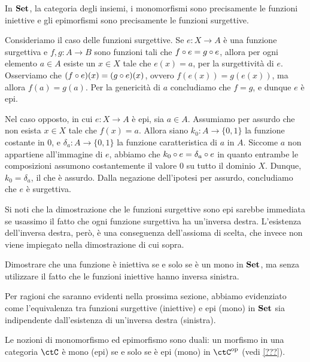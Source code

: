 \begin{example}
	In \(\mathbf{Set}\), la categoria degli insiemi, i monomorfismi sono precisamente le funzioni iniettive
	e gli epimorfismi sono precisamente le funzioni surgettive.

	Consideriamo il caso delle funzioni surgettive.
	Se \(e \colon X \to A\) è una funzione surgettiva e \(f, g \colon A \to B\) sono funzioni tali che \(f \circ e = g \circ e\),
	allora per ogni elemento \(a \in A\) esiste un \(x \in X\) tale che \(e(x) = a\), per la surgettività di \(e\).
	Osserviamo che \((f \circ e)(x) = (g \circ e)(x)\), ovvero \(f(e(x)) = g(e(x))\),
	ma allora \(f(a) = g(a)\).
	Per la genericità di \(a\) concludiamo che \(f = g\), e dunque \(e\) è epi.

	Nel caso opposto, in cui \(e \colon X \to A\) è epi, sia \(a \in A\).
	Assumiamo per assurdo che non esista \(x \in X\) tale che \(f(x) = a\).
	Allora siano \(k_0 \colon A \to \{0, 1\}\) la funzione costante in \(0\),
	e \(\delta_a \colon A \to \{0, 1\}\) la funzione caratteristica di \(a\) in \(A\).
	Siccome \(a\) non appartiene all'immagine di \(e\), abbiamo che \(k_0 \circ e = \delta_a \circ e\)
	in quanto entrambe le composizioni assumono costantemente il valore \(0\) su tutto il dominio \(X\).
	Dunque, \(k_0 = \delta_a\), il che è assurdo.
	Dalla negazione dell'ipotesi per assurdo, concludiamo che \(e\) è surgettiva.
\end{example}

Si noti che la dimostrazione che le funzioni surgettive sono epi sarebbe immediata
se usassimo il fatto che ogni funzione surgettiva ha un'inversa destra.
L'esistenza dell'inversa destra, però, è una conseguenza dell'assioma di scelta,
che invece non viene impiegato nella dimostrazione di cui sopra.

\begin{exercise}
	Dimostrare che una funzione è iniettiva se e solo se è un mono in \(\mathbf{Set}\),
	ma senza utilizzare il fatto che le funzioni iniettive hanno inversa sinistra.
\end{exercise}

Per ragioni che saranno evidenti nella prossima sezione,
abbiamo evidenziato come l'equivalenza tra funzioni surgettive (iniettive)
e epi (mono) in \(\mathbf{Set}\) sia indipendente dall'esistenza di un'inversa destra (sinistra).

\begin{remark}
\label{rmk:mono-epi-duality}
Le nozioni di monomorfismo ed epimorfismo sono duali:
un morfismo in una categoria \(\ctC\) è mono (epi) se e solo se è epi (mono) in \(\ctC^{\op}\) (vedi \ref{???}).
\end{remark}

